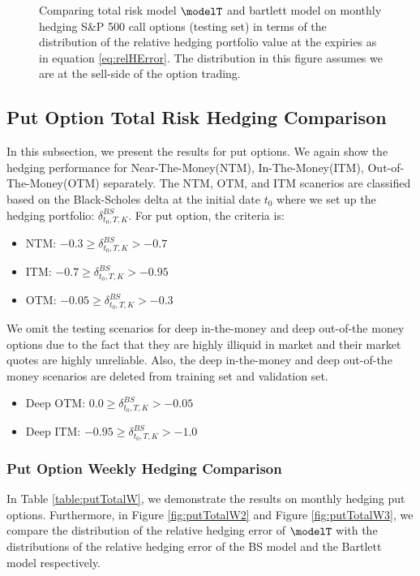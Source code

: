 \begin{figure}[htp!]
	\caption{Comparing total risk model $\modelT$ and bartlett model on monthly hedging S\&P 500 call options (testing set) in terms of the distribution of the  relative hedging portfolio value at the expiries as in equation \eqref{eq:relHError}. The distribution in this figure assumes we are at the sell-side of the option trading.} \label{fig:CallTotalM3}
\end{figure}

\newpage
\subsection{Put Option Total Risk Hedging Comparison}

In this subsection, we present the results for put options. We again show the hedging performance for Near-The-Money(NTM), In-The-Money(ITM), Out-of-The-Money(OTM) separately.  The NTM, OTM, and ITM scanerios are classified based on the Black-Scholes delta at the initial date $t_0$ where we set up the hedging portfolio: $\delta^{BS}_{t_0,T,K}$. For put option, the criteria is:
\begin{itemize}
	\item  NTM: $-0.3 \geq \delta^{BS}_{t_0,T,K} >-0.7$
	\item ITM: $-0.7 \geq \delta^{BS}_{t_0,T,K} >-0.95$
	\item  OTM: $-0.05 \geq \delta^{BS}_{t_0,T,K} >-0.3$
\end{itemize}
We omit the testing scenarios for deep in-the-money and deep out-of-the money options due to the fact that they are highly illiquid in market and their market quotes are highly unreliable. Also, the deep in-the-money and deep out-of-the money scenarios are deleted from training set and validation set.
\begin{itemize}
	\item  Deep OTM: $0.0 \geq \delta^{BS}_{t_0,T,K} >-0.05$
	\item  Deep ITM: $-0.95 \geq \delta^{BS}_{t_0,T,K} >-1.0$
\end{itemize}
\subsubsection{Put Option Weekly Hedging Comparison}
In Table \ref{table:putTotalW}, we demonstrate the results on monthly hedging put options. Furthermore, in Figure \ref{fig:putTotalW2} and  Figure \ref{fig:putTotalW3}, we compare the distribution of the relative hedging error of $\modelT$ with the distributions of the relative hedging error of the BS model and the Bartlett model respectively.


